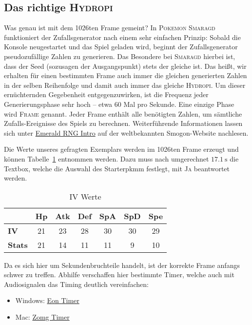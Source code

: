 \documentclass[11pt,a4paper,titlepage]{article}
\begin{document}
{{{\subsection{Das richtige \textsc{Hydropi}}{
\label{sec:correct_mudkip}
Was genau ist mit dem 1026ten Frame gemeint? In \textsc{Pokemon Smaragd} funktioniert der Zufallsgenerator nach einem sehr einfachen Prinzip: Sobald die Konsole neugestartet und das Spiel geladen wird, beginnt der Zufallsgenerator pseudozufällige Zahlen zu generieren. Das Besondere bei \textsc{Smaragd} hierbei ist, dass der Seed (sozusagen der Ausgangspunkt) stets der gleiche ist. Das heißt, wir erhalten für einen bestimmten Frame auch immer die gleichen generierten Zahlen in der selben Reihenfolge und damit auch immer das gleiche \textsc{Hydropi}. Um dieser ernüchternden Gegebenheit entgegenzuwirken, ist die Frequenz jeder Generierungsphase sehr hoch -- etwa 60 Mal pro Sekunde. Eine einzige Phase wird  \textsc{Frame} genannt. Jeder Frame enthält alle benötigten Zahlen, um sämtliche Zufalls-Ereignisse des Spiels zu berechnen. Weiterführende Informationen lassen sich unter \href{http://www.smogon.com/ingame/rng/emerald_rng_intro}{Emerald RNG Intro} auf der weltbekannten Smogon-Website nachlesen.


Die Werte unseres gefragten Exemplars werden im 1026ten Frame erzeugt und können Tabelle~\ref{tab:mudkip_ivs} entnommen werden. Dazu muss nach umgerechnet $17.1~\si{\second}$ die Textbox, welche die Auswahl des Starterpkmm festlegt, mit \textsc{Ja} beantwortet werden.

\begin{table}[htb]
	\caption{IV Werte}
	\label{tab:mudkip_ivs}
	\centering
	\begin{tabular}{lcccccc}
		\toprule
		&\textbf{Hp}	&\textbf{Atk}&\textbf{Def}&\textbf{SpA}&\textbf{SpD}	&\textbf{Spe} \\
		\midrule
			\textbf{IV}		&21		&23		&28		&30		&30		&29		\\
			\textbf{Stats}	&21		&14		&11		&11		&9		&10		\\
		\bottomrule
	\end{tabular}
\end{table}
 
Da es sich hier um Sekundenbruchteile handelt, ist der korrekte Frame anfangs schwer zu treffen. Abhilfe verschaffen hier bestimmte Timer, welche auch mit Audiosignalen das Timing deutlich vereinfachen:

\begin{itemize}
\item Windows: \href{https://bitbucket.org/ToastPlusOne/eontimer/downloads/EonTimer-1_6.1.zip}{Eon Timer}
\item Mac: \href{https://www.dropbox.com/s/aurp9y34j5rdbhv/ZomgTimer-V2_21.jar#}{Zomg Timer}
\end{itemize}

}}}}
\end{document}
